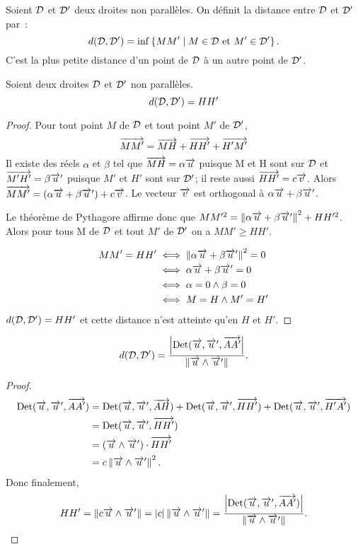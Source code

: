 \begin{defdef}
  Soient $\Dr$ et $\Dr'$ deux droites non parallèles. On définit la distance entre $\Dr$ et $\Dr'$ par~:
  \begin{equation}
    d(\Dr,\Dr')=\inf\enstq{MM'}{M \in \Dr \text{~et~} M'\in \Dr'}.
  \end{equation}
C'est la plus petite distance d'un point de $\Dr$ à un autre point de $\Dr'$.
\end{defdef}
\begin{prop}
  Soient deux droites $\Dr$ et $\Dr'$ non parallèles.
  \begin{equation}
    d(\Dr,\Dr')=HH'
  \end{equation}
\end{prop}
\begin{proof}
  Pour tout point $M$ de $\Dr$ et tout point $M'$ de $\Dr'$, 
  \begin{equation}
    \vect{MM'}=\vect{MH}+\vect{HH'}+\vect{H'M'}
  \end{equation}
Il existe des réels $\alpha$ et $\beta$ tel que $\vect{MH}=\alpha\vu$ puisque M et H sont sur $\Dr$ et $\vect{M'H'}=\beta\vu'$ puisque $M'$ et $H'$ sont sur $\Dr'$; il reste aussi $\vect{HH'}=c\vv$. Alors $\vect{MM'}=(\alpha\vu+\beta\vu')+c\vv$. Le vecteur $\vv$ est orthogonal à $\alpha\vu+\beta\vu'$.

Le théorème de Pythagore affirme donc que $MM'^2=\norme{\alpha\vu+\beta\vu'}^2+HH'^2$. Alors pour tous M de $\Dr$ et tout $M'$ de $\Dr'$ on a $MM'\geqslant HH'$.

\begin{align}
  MM'=HH' &\iff \norme{\alpha\vu+\beta\vu'}^2=0\\
&\iff \alpha\vu+\beta\vu'=0\\
&\iff \alpha=0 \wedge \beta=0\\
&\iff M=H \wedge M'=H'
\end{align}
$d(\Dr,\Dr')=HH'$ et cette distance n'est atteinte qu'en $H$ et $H'$.
\end{proof}
\begin{prop}
  \begin{equation}
    d(\Dr,\Dr')=\frac{\abs{\Det(\vu,\vu',\vect{AA'}}}{\norme{\vu\wedge\vu'}}.
  \end{equation}
\end{prop}
\begin{proof}
  \begin{align}
    \Det(\vu,\vu',\vect{AA'})&=\Det(\vu,\vu',\vect{AH})+\Det(\vu,\vu',\vect{HH'})+\Det(\vu,\vu',\vect{H'A'})\\
    &=\Det(\vu,\vu',\vect{HH'})\\
    &=(\vu\wedge\vu')\cdot\vect{HH'}\\
    &=c\norme{\vu\wedge\vu'}^2.
  \end{align}
  Donc finalement, 
  \begin{equation}
    HH'=\norme{c\vu\wedge\vu'}=\abs{c}\norme{\vu\wedge\vu'}=\frac{\abs{\Det(\vu,\vu',\vect{AA'})}}{\norme{\vu\wedge\vu'}}.
  \end{equation}
\end{proof}

